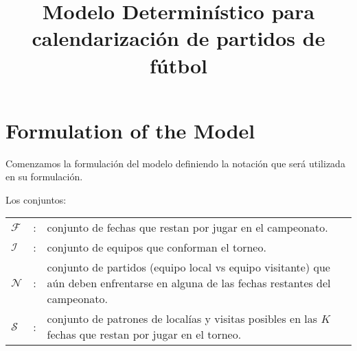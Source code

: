 \documentclass[authoryear,preprint,review,12pts]{elsarticle}
\begin{document}
\begin{frontmatter}

\newtheorem{lem}{Lema}
\newtheorem{defi}{Definition}
\newtheorem{pro}{Proposition}
\newtheorem{cor}{Corollary}


\title{Modelo Determinístico para calendarización de partidos de fútbol}


\end{frontmatter}


\section{Formulation of the Model}\label{FM}
Comenzamos la formulación del modelo definiendo la notación que será utilizada en su formulación.

\vspace{0.05in} Los conjuntos:

\begin{tabular}{p{1.6cm}cp{12.69cm}}
$\mathcal{F}$   & : & conjunto de fechas que restan por jugar en el campeonato.\\
$\mathcal{I}$   & : & conjunto de equipos que conforman el torneo.\\
$\mathcal{N}$   & : & conjunto de partidos (equipo local vs equipo visitante) que aún deben enfrentarse en alguna de las fechas restantes del campeonato.\\
$\mathcal{S}$   & : & conjunto de patrones de localías y visitas posibles en las $K$ fechas que restan por jugar en el torneo.
\end{tabular}
\end{document}
